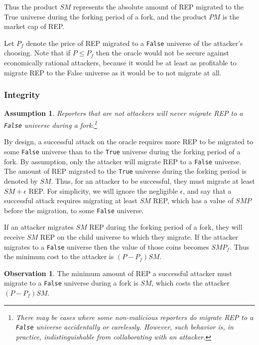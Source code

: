 \documentclass[floatfix,reprint,nofootinbib,amsmath,amssymb,epsfig,pre,floats,letterpaper,groupedaffiliation]{revtex4-1}
\newtheorem{assumption}{Assumption}
\theoremstyle{definition}
\newtheorem{observation}{Observation}
\theoremstyle{definition}
\begin{document}
Thus the product $SM$ represents the absolute amount of REP migrated to the True universe during the forking period of a fork, and the product $PM$ is the market cap of REP.

Let $P_f$ denote the price of REP migrated to a \texttt{False} universe of the attacker's choosing.  Note that if $P \leq P_f$ then the oracle would not be secure against economically rational attackers, because it would be at least as profitable to migrate REP to the False universe as it would be to not migrate at all.

\subsubsection{Integrity}

\begin{assumption}
Reporters that are not attackers will never migrate REP to a \texttt{False} universe during a fork.\footnote{There may be cases where some non-malicious reporters do migrate REP to a \texttt{False} universe accidentally or carelessly.  However, such behavior is, in practice, indistinguishable from collaborating with an attacker.}
\end{assumption}

By design, a successful attack on the oracle requires more REP to be migrated to some \texttt{False} universe than to the \texttt{True} universe during the forking period of a fork.  By assumption, only the attacker will migrate REP to a \texttt{False} universe.  The amount of REP migrated to the \texttt{True} universe during the forking period is denoted by $SM$.  Thus, for an attacker to be successful, they must migrate at least $SM + \epsilon$ REP.  For simplicity, we will ignore the negligible $\epsilon$, and say that a successful attack requires migrating at least $SM$ REP, which has a value of $SMP$ before the migration, to some \texttt{False} universe.

If an attacker migrates $SM$ REP during the forking period of a fork, they will receive $SM$ REP on the child universe to which they migrate. If the attacker migrates to a \texttt{False} universe then the value of those coins becomes $SMP_f$.  Thus the minimum cost to the attacker is $(P - P_f)SM$.

\begin{observation}
The minimum amount of REP a successful attacker must migrate to a \texttt{False} universe during a fork is $SM$, which costs the attacker $(P - P_f)SM$.
\end{observation}
\end{document}

